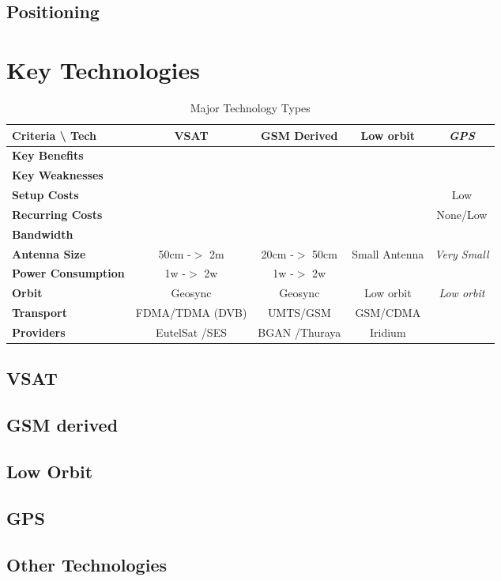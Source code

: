 \subsection{Positioning}
\label{positioning}

\section{Key Technologies}
\label{keytechnologies}

 \begin{landscape} 

\begin{table}[htbp]
\begin{minipage}{\linewidth}
\setlength{\tymax}{0.5\linewidth}
\centering
\small
\caption{Major Technology Types}
\label{majortechnologytypes}
\begin{tabulary}{\textwidth}{@{}LCCCC@{}} \toprule
Criteria \textbackslash{} Tech&VSAT&GSM Derived&Low orbit&\emph{GPS}\\
\midrule
\textbf{Key Benefits}&&&&\\
\textbf{Key Weaknesses}&&&&\\
\textbf{Setup Costs}&&&&Low\\
\textbf{Recurring Costs}&&&&None\slash Low\\
\textbf{Bandwidth}&&&&\\
\textbf{Antenna Size}&50cm -$>$ 2m&20cm -$>$ 50cm&Small Antenna&\emph{Very Small}\\
\textbf{Power Consumption}&1w -$>$ 2w&1w -$>$ 2w&&\\
\textbf{Orbit}&Geosync&Geosync&Low orbit&\emph{Low orbit}\\
\textbf{Transport}&FDMA\slash TDMA (DVB)&UMTS\slash GSM&GSM\slash CDMA&\\
\textbf{Providers}&EutelSat \slash  SES&BGAN \slash  Thuraya&Iridium&\\

\bottomrule

\end{tabulary}
\end{minipage}
\end{table}

 \end{landscape} 

\subsection{VSAT}
\label{vsat}

\subsection{GSM derived}
\label{gsmderived}

\subsection{Low Orbit}
\label{loworbit}

\subsection{GPS}
\label{gps}

\subsection{Other Technologies}
\label{othertechnologies}
